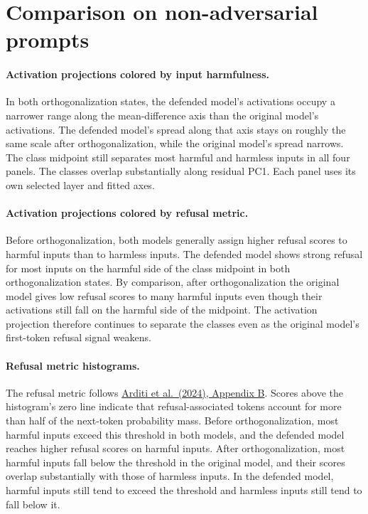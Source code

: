 \documentclass[10pt,letterpaper]{article}
\begin{document}
\section{Comparison on non-adversarial prompts}

\paragraph{Activation projections colored by input harmfulness.}
In both orthogonalization states, the defended model's activations occupy a narrower range along the mean-difference axis than the original model's activations. The defended model's spread along that axis stays on roughly the same scale after orthogonalization, while the original model's spread narrows. The class midpoint still separates most harmful and harmless inputs in all four panels. The classes overlap substantially along residual PC1. Each panel uses its own selected layer and fitted axes.

\paragraph{Activation projections colored by refusal metric.}
Before orthogonalization, both models generally assign higher refusal scores to harmful inputs than to harmless inputs. The defended model shows strong refusal for most inputs on the harmful side of the class midpoint in both orthogonalization states. By comparison, after orthogonalization the original model gives low refusal scores to many harmful inputs even though their activations still fall on the harmful side of the midpoint. The activation projection therefore continues to separate the classes even as the original model's first-token refusal signal weakens.

\paragraph{Refusal metric histograms.}
The refusal metric follows \href{https://arxiv.org/html/2406.11717v3}{Arditi et al.\ (2024), Appendix B}. Scores above the histogram's zero line indicate that refusal-associated tokens account for more than half of the next-token probability mass. Before orthogonalization, most harmful inputs exceed this threshold in both models, and the defended model reaches higher refusal scores on harmful inputs. After orthogonalization, most harmful inputs fall below the threshold in the original model, and their scores overlap substantially with those of harmless inputs. In the defended model, harmful inputs still tend to exceed the threshold and harmless inputs still tend to fall below it.
\end{document}
